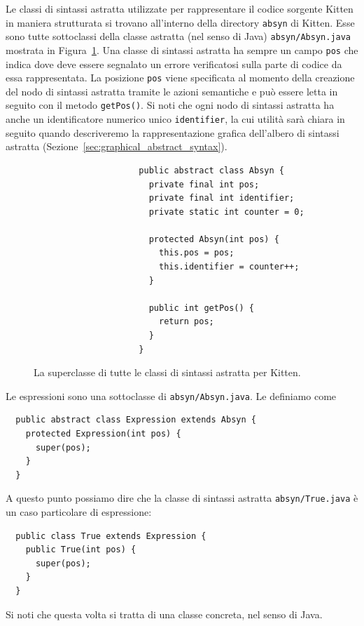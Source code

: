 Le classi di sintassi astratta utilizzate
per rappresentare il codice sorgente Kitten in maniera strutturata si trovano
all'interno della directory \texttt{absyn} di Kitten.
Esse sono tutte sottoclassi della classe astratta
(nel senso di Java) \texttt{absyn/Absyn.java} mostrata in
Figura~\ref{fig:absyn.Absyn}.
Una classe di sintassi astratta ha sempre un campo \texttt{pos} che
indica dove deve essere segnalato un errore verificatosi sulla parte di codice
da essa rappresentata. La posizione \texttt{pos} viene specificata
al momento della creazione del nodo di sintassi astratta tramite le azioni
semantiche e pu\`o essere letta in seguito con il metodo \texttt{getPos()}.
Si noti che ogni nodo di sintassi
astratta ha anche un identificatore numerico unico \texttt{identifier},
la cui utilit\`a sar\`a chiara in seguito quando descriveremo la
rappresentazione grafica dell'albero di sintassi astratta
(Sezione~\ref{sec:graphical_abstract_syntax}).
%
\begin{figure}[t]
\begin{verbatim}
                     public abstract class Absyn {
                       private final int pos;
                       private final int identifier;
                       private static int counter = 0;

                       protected Absyn(int pos) {
                         this.pos = pos;
                         this.identifier = counter++;
                       }

                       public int getPos() {
                         return pos;
                       }
                     }
\end{verbatim}
\caption{La superclasse di tutte le classi di sintassi astratta per Kitten.}
  \label{fig:absyn.Absyn}
\end{figure}

Le espressioni sono una sottoclasse di \texttt{absyn/Absyn.java}.
Le definiamo come
%
\begin{verbatim}
  public abstract class Expression extends Absyn {
    protected Expression(int pos) {
      super(pos);
    }
  }
\end{verbatim}
%
A questo punto possiamo dire che la classe di sintassi astratta
\texttt{absyn/True.java} \`e un caso particolare di espressione:
%
\begin{verbatim}
  public class True extends Expression {
    public True(int pos) {
      super(pos);
    }
  }
\end{verbatim}
%
Si noti che questa volta si tratta di una classe concreta, nel senso di Java.

